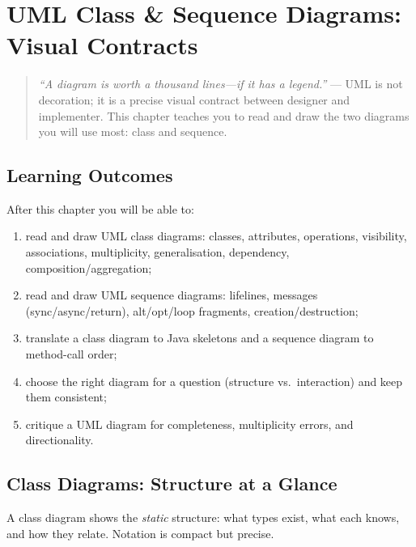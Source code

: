 \chapter{UML Class \& Sequence Diagrams: Visual Contracts}
\label{ch:uml}

\begin{quote}
\emph{``A diagram is worth a thousand lines---if it has a legend.''} --- UML is not decoration; it is a precise visual contract between designer and implementer. This chapter teaches you to read and draw the two diagrams you will use most: class and sequence.
\end{quote}

\noindent{}
\vspace{0.4em}

\section*{Learning Outcomes}
After this chapter you will be able to:
\begin{enumerate}[label=(L\arabic*)]
    \item read and draw UML class diagrams: classes, attributes, operations, visibility, associations, multiplicity, generalisation, dependency, composition/aggregation;
    \item read and draw UML sequence diagrams: lifelines, messages (sync/async/return), alt/opt/loop fragments, creation/destruction;
    \item translate a class diagram to Java skeletons and a sequence diagram to method-call order;
    \item choose the right diagram for a question (structure vs.\ interaction) and keep them consistent;
    \item critique a UML diagram for completeness, multiplicity errors, and directionality.
\end{enumerate}

\section{Class Diagrams: Structure at a Glance}
\label{sec:class-diagrams}
A class diagram shows the \emph{static} structure: what types exist, what each knows, and how they relate. Notation is compact but precise.

